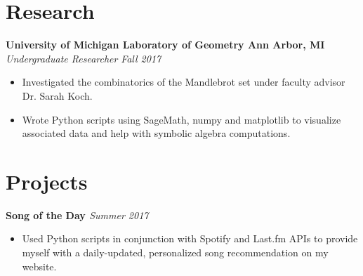\documentclass[margin,line]{resume}
\begin{document}
\begin{resume}
	\section{\mysidestyle Research}
	\textbf{University of Michigan Laboratory of Geometry \href{https://github.com/jonathoma/LogM}{\faGithub} \hfill Ann Arbor, MI} \\\vspace{1mm}%
	\textsl{Undergraduate Researcher} \hfill \textsl{Fall 2017}
	\begin{itemize}[leftmargin=4mm]
		\item Investigated the combinatorics of the Mandlebrot set under faculty advisor Dr. Sarah Koch.
		\item Wrote Python scripts using SageMath, numpy and matplotlib to visualize associated data and help with symbolic algebra computations. 
	\end{itemize}
	\vspace{1.5mm}
	
	\sectionbreak
	\vspace{-2.5mm}
	\section{\mysidestyle Projects}
	\textbf{Song of the Day \href{https://github.com/jonathoma/songoftheday}{\faGithub}}  \hfill \textsl{Summer 2017} \vspace{1mm}%
	\begin{itemize}[leftmargin=4mm]
		\item Used Python scripts in conjunction with Spotify and Last.fm APIs to provide myself with a daily-updated, personalized song recommendation on my website.
	\end{itemize}
	\vspace{1.5mm}
	   

\end{resume}
\end{document}
